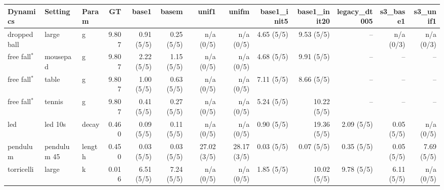 \begin{tabular}{lll r r r r r r r r r r}
\toprule
Dynamics & Setting & Param & GT & base1 & basem & unif1 & unifm & base1_init5 & base1_init20 & legacy_dt005 & s3_base1 & s3_unif1 \\
\midrule
dropped ball & large & g & 9.807 & 0.91 (5/5) & 0.25 (5/5) & n/a (0/5) & n/a (0/5) & 4.65 (5/5) & 9.53 (5/5) & -- & n/a (0/3) & n/a (0/3) \\
free fall$^\ast$ & mousepad & g & 9.807 & 2.22 (5/5) & 1.15 (5/5) & n/a (0/5) & n/a (0/5) & 4.68 (5/5) & 9.91 (5/5) & -- & -- & -- \\
free fall$^\ast$ & table & g & 9.807 & 1.00 (5/5) & 0.63 (5/5) & n/a (0/5) & n/a (0/5) & 7.11 (5/5) & 8.66 (5/5) & -- & -- & -- \\
free fall$^\ast$ & tennis & g & 9.807 & 0.41 (5/5) & 0.27 (5/5) & n/a (0/5) & n/a (0/5) & 5.24 (5/5) & 10.22 (5/5) & -- & -- & -- \\
led & led 10s & decay & 0.460 & 0.09 (5/5) & 0.11 (5/5) & n/a (0/5) & n/a (0/5) & 0.90 (5/5) & 19.36 (5/5) & 2.09 (5/5) & 0.05 (5/5) & n/a (0/5) \\
pendulum & pendulum 45 & length & 0.450 & 0.03 (5/5) & 0.03 (5/5) & 27.02 (3/5) & 28.17 (3/5) & 0.03 (5/5) & 0.07 (5/5) & 0.35 (5/5) & 0.05 (5/5) & 7.69 (5/5) \\
torricelli & large & k & 0.016 & 6.51 (5/5) & 7.24 (5/5) & n/a (0/5) & n/a (0/5) & 1.85 (5/5) & 10.02 (5/5) & 9.78 (5/5) & 6.11 (5/5) & n/a (0/5) \\
\bottomrule
\end{tabular}
